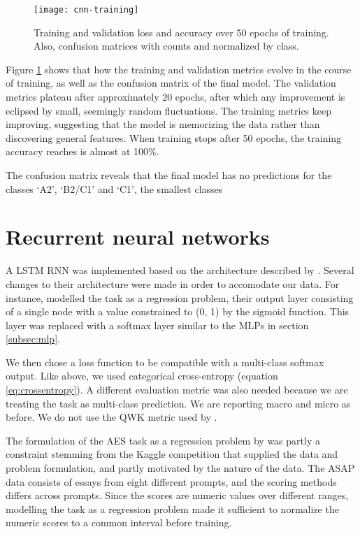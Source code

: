 \begin{figure}
  \centering
  \texttt{[image: cnn-training]}
  \caption{Training and validation loss and accuracy over 50 epochs of training.
           Also, confusion matrices with counts and normalized by class.}
  \label{fig:cnn-training}
\end{figure}

Figure \ref{fig:cnn-training} shows that how the training and validation metrics
evolve in the course of training, as well as the confusion matrix of the final model. The validation metrics
plateau after approximately 20 epochs, after which any improvement is
eclipsed by small, seemingly random fluctuations. The training metrics keep
improving, suggesting that the model is memorizing the data rather than
discovering general features. When training stops after 50 epochs, the
training accuracy reaches is almost at 100\%.

The confusion matrix reveals that the final model has no predictions for the
classes `A2', `B2/C1' and `C1', the smallest classes 


\section{Recurrent neural networks}

A \ac{LSTM} \ac{RNN} was implemented based on the architecture described by
\textcite{taghipour16}. Several changes to their architecture were made in
order to accomodate our data. For instance, \citeauthor{taghipour16} modelled
the task as a regression problem, their output layer consisting of a single
node with a value constrained to (0, 1) by the sigmoid function. This layer
was replaced with a softmax layer similar to the \acp{MLP} in section
\ref{subsec:mlp}.

We then chose a loss function to be compatible with a multi-class softmax
output. Like above, we used categorical cross-entropy (equation
\ref{eq:crossentropy}). A different evaluation metric was also needed because
we are treating the task as multi-class prediction. We are reporting macro
and micro \FI as before. We do not use the \ac{QWK} metric used by
\citeauthor{taghipour16}. 

The formulation of the \ac{AES} task as a regression problem by
\citeauthor{taghipour16} was partly a constraint stemming from the Kaggle
competition that supplied the data and problem formulation, and partly
motivated by the nature of the data. The ASAP data consists of essays from
eight different prompts, and the scoring methods differs across prompts.
Since the scores are numeric values over different ranges, modelling the task
as a regression problem made it sufficient to normalize the numeric scores to
a common interval before training.

